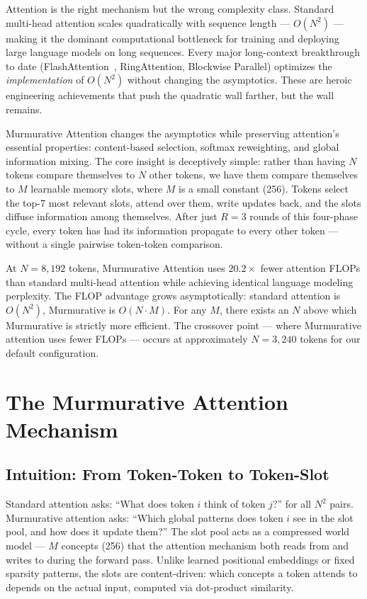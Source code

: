 \documentclass{article}
\begin{document}
Attention is the right mechanism but the wrong complexity class. Standard multi-head attention scales quadratically with sequence length — $O(N^2)$ — making it the dominant computational bottleneck for training and deploying large language models on long sequences. Every major long-context breakthrough to date (FlashAttention~\cite{dao2022flashattention,dao2023flashattention2}, RingAttention, Blockwise Parallel) optimizes the \textit{implementation} of $O(N^2)$ without changing the asymptotics. These are heroic engineering achievements that push the quadratic wall farther, but the wall remains.

Murmurative Attention changes the asymptotics while preserving attention's essential properties: content-based selection, softmax reweighting, and global information mixing. The core insight is deceptively simple: rather than having $N$ tokens compare themselves to $N$ other tokens, we have them compare themselves to $M$ learnable memory slots, where $M$ is a small constant (256). Tokens select the top-7 most relevant slots, attend over them, write updates back, and the slots diffuse information among themselves. After just $R=3$ rounds of this four-phase cycle, every token has had its information propagate to every other token — without a single pairwise token-token comparison.

At $N=8{,}192$ tokens, Murmurative Attention uses $20.2\times$ fewer attention FLOPs than standard multi-head attention while achieving identical language modeling perplexity. The FLOP advantage grows asymptotically: standard attention is $O(N^2)$, Murmurative is $O(N \cdot M)$. For any $M$, there exists an $N$ above which Murmurative is strictly more efficient. The crossover point — where Murmurative attention uses fewer FLOPs — occurs at approximately $N=3{,}240$ tokens for our default configuration.

\section{The Murmurative Attention Mechanism}

\subsection{Intuition: From Token-Token to Token-Slot}

Standard attention asks: ``What does token $i$ think of token $j$?'' for all $N^2$ pairs. Murmurative attention asks: ``Which global patterns does token $i$ see in the slot pool, and how does it update them?'' The slot pool acts as a compressed world model — $M$ concepts (256) that the attention mechanism both reads from and writes to during the forward pass. Unlike learned positional embeddings or fixed sparsity patterns, the slots are content-driven: which concepts a token attends to depends on the actual input, computed via dot-product similarity.
\end{document}
